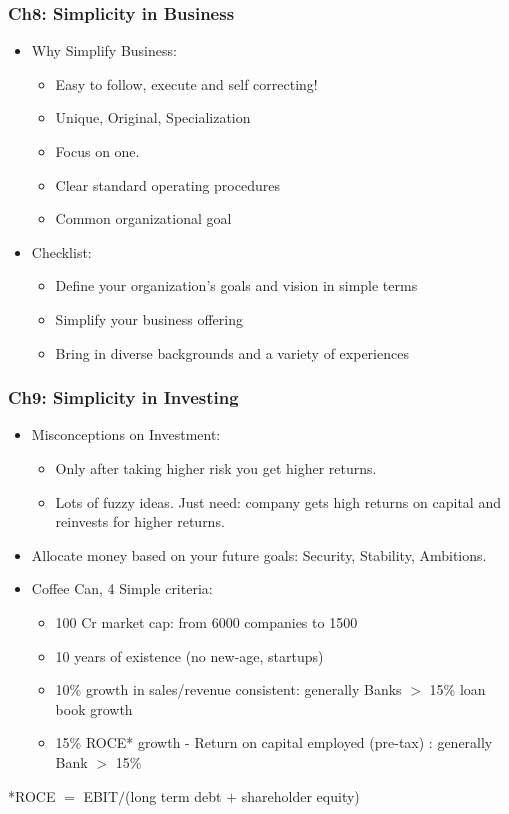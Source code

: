 \begin{frame}[fragile]\frametitle{Ch8: Simplicity in Business}

\begin{itemize}
\item Why Simplify Business:
	\begin{itemize}
	\item Easy to follow, execute and self correcting!
	\item Unique, Original, Specialization
	\item Focus on one.
	\item Clear standard operating procedures
	\item Common organizational goal
	\end{itemize}
\item Checklist:
	\begin{itemize}
	\item Define your organization’s goals and vision in simple terms
	\item Simplify your business offering
	\item Bring in diverse backgrounds and a variety of experiences
	\end{itemize}
\end{itemize}

\end{frame}


\begin{frame}[fragile]\frametitle{Ch9: Simplicity in Investing}

\begin{itemize}
\item Misconceptions on Investment:
	\begin{itemize}
	\item Only after taking higher risk you get higher returns.
	\item Lots of fuzzy ideas. Just need:  company gets high returns on capital and reinvests for higher returns.
	\end{itemize}
\item Allocate money based on your future goals: Security, Stability, Ambitions.
\item Coffee Can, 4 Simple criteria:
	\begin{itemize}
	\item 100 Cr market cap: from 6000 companies to 1500
	\item 10 years of existence (no new-age, startups)
	\item  10\% growth in sales/revenue consistent: generally  Banks $>$ 15\% loan book growth
	\item 15\% ROCE* growth  - Return on capital employed (pre-tax) : generally Bank $>$ 15\%
	\end{itemize} 
\end{itemize}

*ROCE $=$ EBIT$/$(long term debt $+$ shareholder equity)

\end{frame}